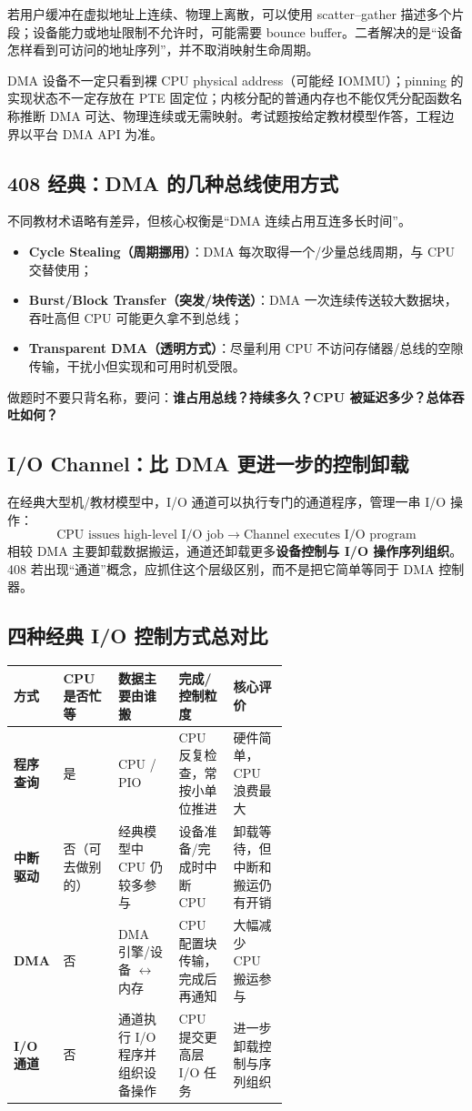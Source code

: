 \documentclass[UTF8,fontset=fandol,11pt,a4paper]{ctexart}
\newcommand{\kw}[1]{\textbf{#1}}
\newcommand{\arr}{\;\longrightarrow\;}
\begin{document}
若用户缓冲在虚拟地址上连续、物理上离散，可以使用 scatter--gather 描述多个片段；设备能力或地址限制不允许时，可能需要 bounce buffer。二者解决的是“设备怎样看到可访问的地址序列”，并不取消映射生命周期。

\begin{warn}[三个不能绝对化的旧稿说法]
DMA 设备不一定只看到裸 CPU physical address（可能经 IOMMU）；pinning 的实现状态不一定存放在 PTE 固定位；内核分配的普通内存也不能仅凭分配函数名称推断 DMA 可达、物理连续或无需映射。考试题按给定教材模型作答，工程边界以平台 DMA API 为准。
\end{warn}

\subsection{408 经典：DMA 的几种总线使用方式}
不同教材术语略有差异，但核心权衡是“DMA 连续占用互连多长时间”。
\begin{itemize}
  \item \kw{Cycle Stealing（周期挪用）}：DMA 每次取得一个/少量总线周期，与 CPU 交替使用；
  \item \kw{Burst/Block Transfer（突发/块传送）}：DMA 一次连续传送较大数据块，吞吐高但 CPU 可能更久拿不到总线；
  \item \kw{Transparent DMA（透明方式）}：尽量利用 CPU 不访问存储器/总线的空隙传输，干扰小但实现和可用时机受限。
\end{itemize}
做题时不要只背名称，要问：\kw{谁占用总线？持续多久？CPU 被延迟多少？总体吞吐如何？}

\subsection{I/O Channel：比 DMA 更进一步的控制卸载}
在经典大型机/教材模型中，I/O 通道可以执行专门的通道程序，管理一串 I/O 操作：
\[
\boxed{\text{CPU issues high-level I/O job}\arr\text{Channel executes I/O program}}
\]
相较 DMA 主要卸载数据搬运，通道还卸载更多\kw{设备控制与 I/O 操作序列组织}。408 若出现“通道”概念，应抓住这个层级区别，而不是把它简单等同于 DMA 控制器。

\subsection{四种经典 I/O 控制方式总对比}
\begingroup
\small
\renewcommand{\arraystretch}{1.25}
\setlength{\tabcolsep}{6pt}
\begin{tabularx}{\linewidth}{>{\bfseries}p{0.18\linewidth} p{0.2\linewidth} p{0.22\linewidth} X X}
\toprule
方式 & CPU 是否忙等 & 数据主要由谁搬 & 完成/控制粒度 & 核心评价 \\
\midrule
程序查询 & 是 & CPU / PIO & CPU 反复检查，常按小单位推进 & 硬件简单，CPU 浪费最大 \\
中断驱动 & 否（可去做别的） & 经典模型中 CPU 仍较多参与 & 设备准备/完成时中断 CPU & 卸载等待，但中断和搬运仍有开销 \\
DMA & 否 & DMA 引擎/设备 $\leftrightarrow$ 内存 & CPU 配置块传输，完成后再通知 & 大幅减少 CPU 搬运参与 \\
I/O 通道 & 否 & 通道执行 I/O 程序并组织设备操作 & CPU 提交更高层 I/O 任务 & 进一步卸载控制与序列组织 \\
\bottomrule
\end{tabularx}
\endgroup
\end{document}
